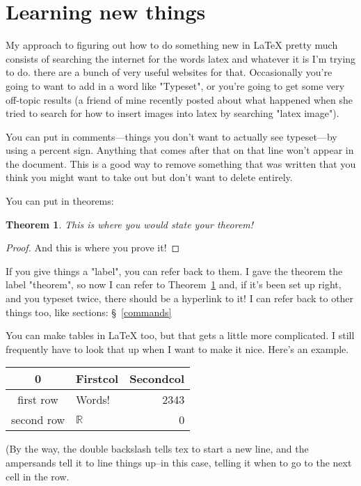 \documentclass[11pt]{article}
\newcommand{\R}{\ensuremath{\mathbb R}}
\newtheorem{theorem}{Theorem}[section]
\theoremstyle{definition}
\begin{document}
\section{Learning new things}

My approach to figuring out how to do something new in LaTeX pretty much consists of searching the internet for the words latex and whatever it is I'm trying to do. there are a bunch of very useful websites for that. Occasionally you're going to want to add in a word like "Typeset", or you're going to get some very off-topic results (a friend of mine recently posted about what happened when she tried to search for how to insert images into latex by searching "latex image").

You can put in comments---things you don't want to actually see typeset---by using a percent sign. Anything that comes after that on that line won't appear in the document. This is a good way to remove something that was written that you think you might want to take out but don't want to delete entirely.

You can put in theorems:

\begin{theorem}\label{thattheorem} This is where you would state your theorem!
\end{theorem}

\begin{proof}
And this is where you prove it!
\end{proof}

If you give things a "label", you can refer back to them. I gave the theorem the label "theorem", so now I can refer to Theorem~\ref{thattheorem} and, if it's been set up right, and you typeset twice, there should be a hyperlink to it! I can refer back to other things too, like sections: \S~\ref{commands}

You can make tables in LaTeX too, but that gets a little more complicated. I still frequently have to look that up when I want to make it nice. Here's an example.

\begin{tabular}{|c|l|r|}
\hline 0 & Firstcol & Secondcol \\ \hline
first row & Words! & 2343 \\\hline second row & $\R$ & 0 \\\hline \end{tabular}

(By the way, the double backslash tells tex to start a new line, and the ampersands tell it to line things up--in this case, telling it when to go to the next cell in the row.
\end{document}
